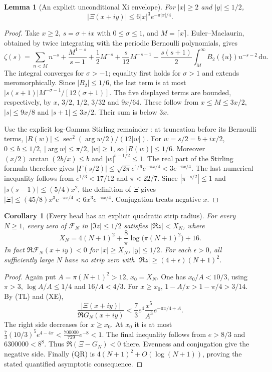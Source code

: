 \documentclass[11pt]{article}
\newtheorem{lemma}[theorem]{Lemma}
\newtheorem{corollary}[theorem]{Corollary}
\theoremstyle{remark}\newtheorem{remark}[theorem]{Remark}
\newcommand{\dd}{\,\mathrm d}
\begin{document}
\begin{lemma}[An explicit unconditional Xi envelope]
\label{lem:xi-envelope}
For $|x|\ge2$ and $|y|\le1/2$,
\[
 |\Xi(x+iy)|\le6|x|^3e^{-\pi|x|/4}.                     \tag{XE}
\]
\end{lemma}
\begin{proof}
Take $x\ge2$, $s=\sigma+ix$ with $0\le\sigma\le1$, and
$M=\lceil x\rceil$.
Euler--Maclaurin, obtained by twice integrating with the periodic
Bernoulli polynomials, gives
\[
 \zeta(s)=\sum_{n<M}n^{-s}+\frac{M^{1-s}}{s-1}
 +\frac12M^{-s}+\frac{s}{12}M^{-s-1}
 -\frac{s(s+1)}2\int_M^\infty B_2(\{u\})u^{-s-2}\dd u .
\]
The integral converges for $\sigma>-1$; equality first holds for
$\sigma>1$ and extends meromorphically. Since $|B_2|\le1/6$,
the last term is at most
$|s(s+1)|M^{-\sigma-1}/[12(\sigma+1)]$.
The five displayed terms are bounded, respectively, by
$x$, $3/2$, $1/2$, $3/32$ and $9x/64$.
These follow from $x\le M\le3x/2$,
$|s|\le9x/8$ and $|s+1|\le3x/2$.
Their sum is below $3x$.

Use the explicit log-Gamma Stirling remainder
\cite[\S5.11(i)--(ii), equation (5.11.1)]{DLMFGamma}:
at truncation before its Bernoulli terms,
$|R(w)|\le\sec^2(\arg w/2)/(12|w|)$.
For $w=s/2=b+ix/2$, $0\le b\le1/2$,
$|\arg w|\le\pi/2$, $|w|\ge1$, so $|R(w)|\le1/6$.
Moreover $(x/2)\arctan(2b/x)\le b$ and $|w|^{b-1/2}\le1$.
The real part of the Stirling formula therefore gives
$|\Gamma(s/2)|\le\sqrt{2\pi}e^{1/6}e^{-\pi x/4}
<3e^{-\pi x/4}$.
The last numerical inequality follows from
$e^{1/3}<17/12$ and $\pi<22/7$.
Since $|\pi^{-s/2}|\le1$ and
$|s(s-1)|\le(5/4)x^2$, the definition of $\Xi$ gives
$|\Xi|\le(45/8)x^3e^{-\pi x/4}<6x^3e^{-\pi x/4}$.
Conjugation treats negative $x$.
\end{proof}

\begin{corollary}[Every head has an explicit quadratic strip radius]
\label{cor:quadratic-head-radius}
For every $N\ge1$, every zero of $\mathcal F_N$ in
$|\Im z|\le1/2$ satisfies $|\Re z|<X_N$, where
\[
 X_N=4(N+1)^2+\frac8\pi\log\!\bigl(\pi(N+1)^2\bigr)+16. \tag{QR}
\]
In fact $\Re\mathcal F_N(x+iy)<0$ for $|x|\ge X_N$,
$|y|\le1/2$.
For each $\epsilon>0$, all sufficiently large $N$ have no strip
zero with $|\Re z|\ge(4+\epsilon)(N+1)^2$.
\end{corollary}
\begin{proof}
Again put $A=\pi(N+1)^2>12$, $x_0=X_N$.
One has $x_0/A<10/3$, using $\pi>3$, $\log A/A\le1/4$ and
$16/A<4/3$.
For $x\ge x_0$, $1-A/x>1-\pi/4>3/14$.
By (TL) and (XE),
\[
 \frac{|\Xi(x+iy)|}{\Re G_N(x+iy)}
 <\frac73 e^4\frac{x^5}{A^3}e^{-\pi x/4+A}.
\]
The right side decreases for $x\ge x_0$.
At $x_0$ it is at most
$\frac73(10/3)^5e^{4-4\pi}
<\frac{700000}{729}e^{-8}<1$.
The final inequality follows from $e>8/3$ and
$6300000<8^8$.
Thus $\Re(\Xi-G_N)<0$ there.
Evenness and conjugation give the negative side.
Finally (QR) is $4(N+1)^2+O(\log(N+1))$, proving the
stated quantified asymptotic consequence.
\end{proof}
\end{document}

